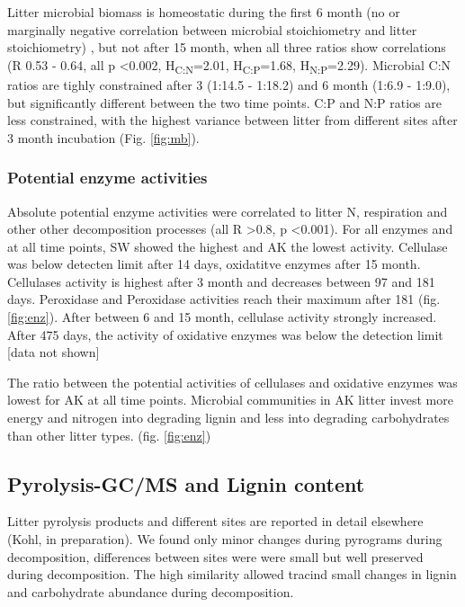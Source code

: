 \documentclass[10pt]{article}
\begin{document}
Litter microbial biomass is homeostatic during the first 6 month (no or marginally negative correlation between microbial stoichiometry and litter stoichiometry) \cite{Mooshammer2011}, but not after 15 month, when all three ratios show correlations (R 0.53 - 0.64, all p \textless 0.002, H\textsubscript{C:N}=2.01, H\textsubscript{C:P}=1.68, H\textsubscript{N:P}=2.29). Microbial C:N ratios are tighly constrained after 3 (1:14.5 - 1:18.2) and 6 month (1:6.9 - 1:9.0), but significantly different between the two time points. C:P and N:P ratios are less constrained, with the highest variance between litter from different sites after 3 month incubation (Fig. \ref{fig:mb}).

\subsubsection*{Potential enzyme activities}
Absolute potential enzyme activities were correlated to litter N, respiration and other other decomposition processes (all R \textgreater  0.8, p \textless 0.001). For all enzymes and at all time points, SW showed the highest and AK the lowest activity. Cellulase was below detecten limit after 14 days, oxidatitve enzymes after 15 month. Cellulases activity is highest after 3 month and decreases between 97 and 181 days. Peroxidase and Peroxidase activities reach their maximum after 181 (fig. \ref{fig:enz}). After between 6 and 15 month, cellulase activity strongly increased. After 475 days, the activity of oxidative enzymes was below the detection limit [data not shown]

The ratio between the potential activities of cellulases and oxidative enzymes was lowest for AK at all time points. Microbial communities in AK litter invest more energy and nitrogen into degrading lignin and less into degrading carbohydrates than other litter types. (fig. \ref{fig:enz})

\subsection*{Pyrolysis-GC/MS and Lignin content}

Litter pyrolysis products and different sites are reported in detail elsewhere (Kohl, in preparation). We found only minor changes during pyrograms during decomposition, differences between sites were were small but well preserved during decomposition. The high similarity allowed tracind small changes in lignin and carbohydrate abundance during decomposition. %
\end{document}
